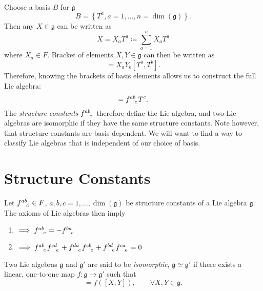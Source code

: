 Choose a basis $B$ for $\mathfrak{g}$
\begin{equation}
  B = \left\{ T^a, a=1, \ldots, n = \dim(\mathfrak{g}) \right\}.
\end{equation}
Then any $X \in \mathfrak{g}$ can be written as
\begin{equation}
  X = X_a T^a \coloneq \sum_{a=1}^n X_a T^a
\end{equation}
where $X_a \in F$. Bracket of elements $X, Y \in \mathfrak{g}$ can then be written as
\begin{equation}
  [X, Y] = X_a Y_b [T^a, T^b].
\end{equation}
Therefore, knowing the brackets of basis elements allows us to construct the full Lie algebra:
\begin{equation}
  [T^a, T^b] = f \indices{^a^b_c} T^c .
\end{equation}
The \emph{structure constants} $f \indices{^a^b_c}$ therefore define the Lie algebra, and two Lie algebras are isomorphic if they have the same structure constants.
Note however, that structure constants are basis dependent. We will want to find a way to classify Lie algebras that is independent of our choice of basis.

\section{Structure Constants}%
\label{sec:structure_constants}

Let $f \indices{^a^b_c} \in F$, $a, b, c = 1, \ldots, \dim(\mathfrak{g})$ be structure constants of a Lie algebra $\mathfrak{g}$.
The axioms of Lie algebras then imply
\begin{enumerate}
  \item $\implies f \indices{^a^b_c} = -f \indices{^b^a_c}$
  \item $\implies f \indices{^a^b_c} f \indices{^c^d_e} + f \indices{^d^a_c} f \indices{^c^b_e} + f \indices{^b^d_c} f \indices{^c^a_e} = 0$
\end{enumerate}

\begin{definition}[isomorphism]
  Two Lie algebras $\mathfrak{g}$ and $\mathfrak{g}'$ are said to be \emph{isomorphic}, $\mathfrak{g} \simeq \mathfrak{g}'$ if there exists a linear, one-to-one map $f: \mathfrak{g} \to \mathfrak{g}'$ such that
  \begin{equation}
    [f(X), f(Y)] = f([X, Y]), \qquad \forall X, Y \in \mathfrak{g}.
  \end{equation}
\end{definition}


